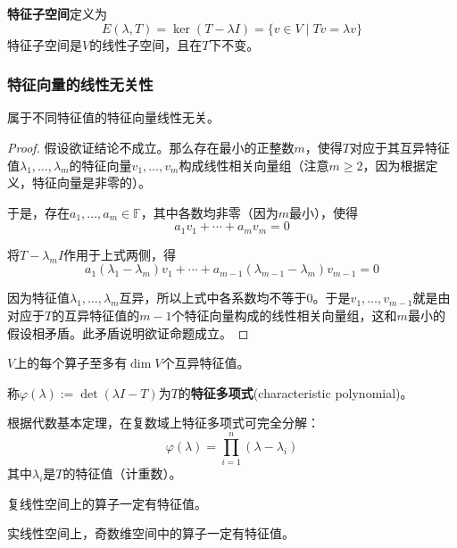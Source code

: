 \begin{definition}[特征子空间]
\textbf{特征子空间}定义为
\[
E(\lambda, T) = \ker(T - \lambda I) = \{v \in V \mid Tv = \lambda v\}
\]
特征子空间是$V$的线性子空间，且在$T$下不变。
\end{definition}

\subsubsection{特征向量的线性无关性}

\begin{theorem}
属于不同特征值的特征向量线性无关。
\end{theorem}

\begin{proof}
假设欲证结论不成立。那么存在最小的正整数$m$，使得$T$对应于其互异特征值$\lambda_1, \ldots, \lambda_m$的特征向量$v_1, \ldots, v_m$构成线性相关向量组（注意$m \geq 2$，因为根据定义，特征向量是非零的）。

于是，存在$a_1, \ldots, a_m \in \mathbb{F}$，其中各数均非零（因为$m$最小），使得
\[
a_1 v_1 + \cdots + a_m v_m = 0
\]

将$T - \lambda_m I$作用于上式两侧，得
\[
a_1(\lambda_1 - \lambda_m)v_1 + \cdots + a_{m-1}(\lambda_{m-1} - \lambda_m)v_{m-1} = 0
\]

因为特征值$\lambda_1, \ldots, \lambda_m$互异，所以上式中各系数均不等于$0$。于是$v_1, \ldots, v_{m-1}$就是由对应于$T$的互异特征值的$m-1$个特征向量构成的线性相关向量组，这和$m$最小的假设相矛盾。此矛盾说明欲证命题成立。
\end{proof}

\begin{corollary}
$V$上的每个算子至多有$\dim V$个互异特征值。
\end{corollary}

\begin{definition}[特征多项式]
称$\varphi(\lambda) := \det(\lambda I - T)$为$T$的\textbf{特征多项式}(characteristic polynomial)。
\end{definition}

根据代数基本定理，在复数域上特征多项式可完全分解：
\[
\varphi(\lambda) = \prod_{i=1}^{n}(\lambda - \lambda_i)
\]
其中$\lambda_i$是$T$的特征值（计重数）。

\begin{theorem}
复线性空间上的算子一定有特征值。

实线性空间上，奇数维空间中的算子一定有特征值。
\end{theorem}

